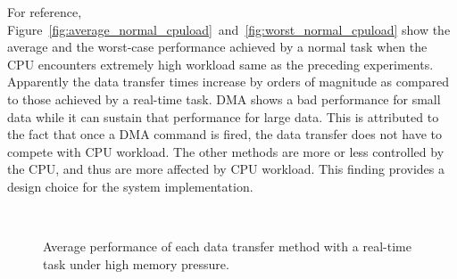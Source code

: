 For reference,
Figure~\ref{fig:average_normal_cpuload}~and~\ref{fig:worst_normal_cpuload}
show the average and the worst-case performance achieved by a normal
task when the CPU encounters extremely high workload same as the
preceding experiments.
Apparently the data transfer times increase by orders of magnitude as
compared to those achieved by a real-time task.
\textsf{DMA} shows a bad performance for small data while it can sustain
that performance for large data.
This is attributed to the fact that once a DMA command is fired, the
data transfer does not have to compete with CPU workload.
The other methods are more or less controlled by the CPU, and thus are
more affected by CPU workload.
This finding provides a design choice for the system implementation.

\begin{figure}[!t]
 \begin{center}
  \\
  \caption{Average performance of each data transfer method with a
  real-time task under high memory pressure.}
  \label{fig:average_realtime_memswap}
 \end{center}
\end{figure}
